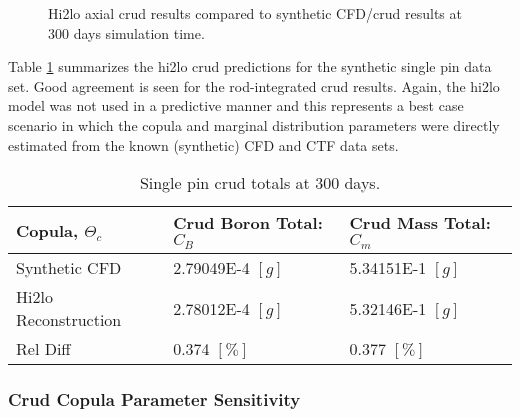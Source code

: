 \begin{figure}[H]%
    \centering
    \qquad
    \caption{Hi2lo axial crud results compared to synthetic CFD/crud results at 300 days simulation time. }%
    \label{fig:hi2lopincmass}%
\end{figure}


Table \ref{tab:crud_totals_2} summarizes the hi2lo crud predictions for the synthetic single pin data set.  Good agreement is seen for the rod-integrated crud results.  Again, the hi2lo model was not used in a predictive manner and this represents a best case scenario in which the copula and marginal distribution parameters were directly estimated from the known (synthetic) CFD and CTF data sets.

\begin{table}[h]
    \begin{center}
        \caption[Crud totals for synthetic and hi2lo models.]{Single pin crud totals at 300 days.}
        \begin{tabular}[h]{|l | l | l |}
            \hline
            Copula, $\Theta_c$ & Crud Boron Total: $C_B$ & Crud Mass Total: $C_m$ \\
            \hline  \hline
            Synthetic CFD &  2.79049E-4 $[g]$ & 5.34151E-1 $[g]$ \\
            Hi2lo Reconstruction &  2.78012E-4  $[g]$ & 5.32146E-1 $[g]$ \\
            \hline
            Rel Diff &  0.374 $[\%]$ & 0.377 $[\%]$ \\
            \hline
        \end{tabular}
        \label{tab:crud_totals_2}
    \end{center}
\end{table}



\subsubsection{Crud Copula Parameter Sensitivity}
\label{sec:crud_copula_sensi}


